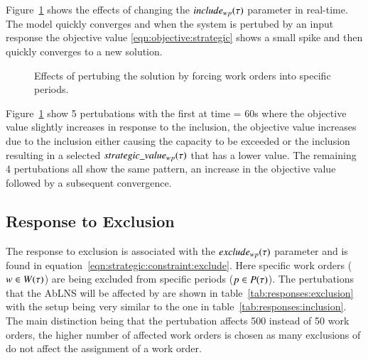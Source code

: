 Figure~\ref{fig:responses:inclusion} shows the effects of changing the $
include_{wp}(\tau)$ parameter in real-time. The model quickly
converges and when the system is pertubed by an input response the objective
value \ref{eqn:objective:strategic} shows a small spike and then quickly converges to a new solution. 

\begin{figure}[H]
	\centering
	\resizebox{10cm}{!}{
		
	}
	\caption{Effects of pertubing the solution by forcing work orders into specific periods.}
	\label{fig:responses:inclusion}
\end{figure}
Figure~\ref{fig:responses:inclusion} 
show 5 pertubations with the first at
time = 60s where the objective value  slightly increases in response to the
inclusion, the objective value increases due to the inclusion either causing
the capacity to be exceeded or the inclusion resulting in a selected $
strategic\_value_{w p}(\tau)$ that has a lower value. The remaining 4 pertubations
all show the same  pattern, an increase in the objective value followed by a
subsequent convergence.

\subsection{Response to Exclusion}\label{sec:exclusion}
The response to exclusion is associated with the $exclude_{wp}(\tau)$
parameter and is found in equation~\ref{eqn:strategic:constraint:exclude}.
Here specific work orders ($w \in W(\tau)$) are
being excluded from specific periods ($p \in P(\tau)$).
The pertubations that the AbLNS will be affected by are shown in
table~\ref{tab:responses:exclusion}
with the setup being very similar to the
one in table~\ref{tab:responses:inclusion}.
The main distinction being that the pertubation affects 500 instead of 50 work orders, the higher number 
of affected work orders is chosen as many exclusions of do not affect the assignment of a work order.

